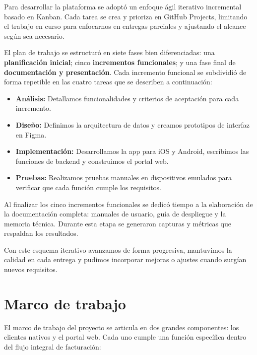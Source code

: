 \begin{large}

Para desarrollar la plataforma se adoptó un enfoque ágil iterativo incremental basado en Kanban. Cada tarea se crea y prioriza en GitHub Projects, limitando el trabajo en curso para enfocarnos en entregas parciales y ajustando el alcance según sea necesario.

El plan de trabajo se estructuró en siete fases bien diferenciadas: una \textbf{planificación inicial}; cinco \textbf{incrementos funcionales}; y una fase final de \textbf{documentación y presentación}. Cada incremento funcional se subdividió de forma repetible en las cuatro tareas que se describen a continuación:

\begin{itemize}
  \item \textbf{Análisis:} Detallamos funcionalidades y criterios de aceptación para cada incremento.
  \item \textbf{Diseño:} Definimos la arquitectura de datos y creamos prototipos de interfaz en Figma.
  \item \textbf{Implementación:} Desarrollamos la app para iOS y Android, escribimos las funciones de backend y construimos el portal web.  
  \item \textbf{Pruebas:} Realizamos pruebas manuales en dispositivos emulados para verificar que cada función cumple los requisitos.
\end{itemize}

Al finalizar los cinco incrementos funcionales se dedicó tiempo a la elaboración de la documentación completa: manuales de usuario, guía de despliegue y la memoria técnica. Durante esta etapa se generaron capturas y métricas que respaldan los resultados.

Con este esquema iterativo avanzamos de forma progresiva, mantuvimos la calidad en cada entrega y pudimos incorporar mejoras o ajustes cuando surgían nuevos requisitos.

\end{large}

\section{Marco de trabajo}

\begin{large}

El marco de trabajo del proyecto se articula en dos grandes componentes: los clientes nativos y el portal web. Cada uno cumple una función específica dentro del flujo integral de facturación:

\end{large}

